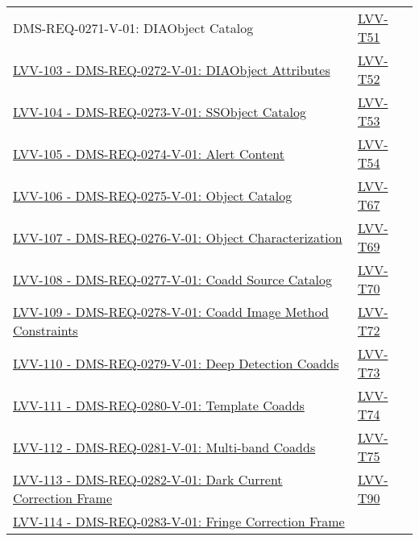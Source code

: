 \begin{longtable}[]{p{13cm}p{3cm}}
{DMS-REQ-0271-V-01: DIAObject Catalog} &
\protect\hyperlink{lvv-t51---verify-implementation-of-diaobject-catalog-dms-req-0271}{LVV-T51}\tabularnewline
\href{https://jira.lsstcorp.org/browse/LVV-103}{LVV-103 -
DMS-REQ-0272-V-01: DIAObject Attributes} &
\protect\hyperlink{lvv-t52---verify-implementation-of-diaobject-attributes-dms-req-0272}{LVV-T52}\tabularnewline
\href{https://jira.lsstcorp.org/browse/LVV-104}{LVV-104 -
DMS-REQ-0273-V-01: SSObject Catalog} &
\protect\hyperlink{lvv-t53---verify-implementation-of-ssobject-catalog-dms-req-0273}{LVV-T53}\tabularnewline
\href{https://jira.lsstcorp.org/browse/LVV-105}{LVV-105 -
DMS-REQ-0274-V-01: Alert Content} &
\protect\hyperlink{lvv-t54---verify-implementation-of-alert-content-dms-req-0274}{LVV-T54}\tabularnewline
\href{https://jira.lsstcorp.org/browse/LVV-106}{LVV-106 -
DMS-REQ-0275-V-01: Object Catalog} &
\protect\hyperlink{lvv-t67---verify-implementation-of-object-catalog-dms-req-0275}{LVV-T67}\tabularnewline
\href{https://jira.lsstcorp.org/browse/LVV-107}{LVV-107 -
DMS-REQ-0276-V-01: Object Characterization} &
\protect\hyperlink{lvv-t69---verify-implementation-of-object-characterization-dms-req-0276}{LVV-T69}\tabularnewline
\href{https://jira.lsstcorp.org/browse/LVV-108}{LVV-108 -
DMS-REQ-0277-V-01: Coadd Source Catalog} &
\protect\hyperlink{lvv-t70---verify-implementation-of-coadd-source-catalog-dms-req-0277}{LVV-T70}\tabularnewline
\href{https://jira.lsstcorp.org/browse/LVV-109}{LVV-109 -
DMS-REQ-0278-V-01: Coadd Image Method Constraints} &
\protect\hyperlink{lvv-t72---verify-implementation-of-coadd-image-method-constraints-dms-req-0278}{LVV-T72}\tabularnewline
\href{https://jira.lsstcorp.org/browse/LVV-110}{LVV-110 -
DMS-REQ-0279-V-01: Deep Detection Coadds} &
\protect\hyperlink{lvv-t73---verify-implementation-of-deep-detection-coadds-dms-req-0279}{LVV-T73}\tabularnewline
\href{https://jira.lsstcorp.org/browse/LVV-111}{LVV-111 -
DMS-REQ-0280-V-01: Template Coadds} &
\protect\hyperlink{lvv-t74---verify-implementation-of-template-coadds-dms-req-0280}{LVV-T74}\tabularnewline
\href{https://jira.lsstcorp.org/browse/LVV-112}{LVV-112 -
DMS-REQ-0281-V-01: Multi-band Coadds} &
\protect\hyperlink{lvv-t75---verify-implementation-of-multi-band-coadds-dms-req-0281}{LVV-T75}\tabularnewline
\href{https://jira.lsstcorp.org/browse/LVV-113}{LVV-113 -
DMS-REQ-0282-V-01: Dark Current Correction Frame} &
\protect\hyperlink{lvv-t90---verify-implementation-of-dark-current-correction-frame-dms-req-0282}{LVV-T90}\tabularnewline
\href{https://jira.lsstcorp.org/browse/LVV-114}{LVV-114 -
DMS-REQ-0283-V-01: Fringe Correction Frame} &

\end{longtable}
